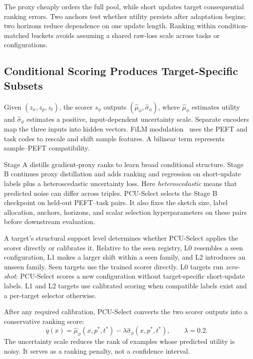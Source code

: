 The proxy cheaply orders the full pool, while short updates target consequential ranking errors. Two anchors test whether utility persists after adaptation begins; two horizons reduce dependence on one update length. Ranking within condition-matched buckets avoids assuming a shared raw-loss scale across tasks or configurations.

\subsection{Conditional Scoring Produces Target-Specific Subsets}

Given $(z_x,z_p,z_t)$, the scorer $s_{\phi}$ outputs $(\widehat{\mu}_{\phi},\widehat{\sigma}_{\phi})$, where $\widehat{\mu}_{\phi}$ estimates utility and $\widehat{\sigma}_{\phi}$ estimates a positive, input-dependent uncertainty scale. Separate encoders map the three inputs into hidden vectors. FiLM modulation~\cite{perez2018film} uses the PEFT and task codes to rescale and shift sample features. A bilinear term represents sample--PEFT compatibility.

Stage A distills gradient-proxy ranks to learn broad conditional structure. Stage B continues proxy distillation and adds ranking and regression on short-update labels plus a heteroscedastic uncertainty loss. Here \emph{heteroscedastic} means that predicted noise can differ across triples. PCU-Select selects the Stage B checkpoint on held-out PEFT--task pairs. It also fixes the sketch size, label allocation, anchors, horizons, and scalar selection hyperparameters on these pairs before downstream evaluation.

A target's structural support level determines whether PCU-Select applies the scorer directly or calibrates it. Relative to the seen registry, L0 resembles a seen configuration, L1 makes a larger shift within a seen family, and L2 introduces an unseen family. Seen targets use the trained scorer directly. L0 targets run \emph{zero-shot}: PCU-Select scores a new configuration without target-specific short-update labels. L1 and L2 targets use calibrated scoring when compatible labels exist and a per-target selector otherwise.

After any required calibration, PCU-Select converts the two scorer outputs into a conservative ranking score:
\begin{equation}
  q(x)=\widehat{\mu}_{\phi}(x,p^{*},t^{*})-\lambda\widehat{\sigma}_{\phi}(x,p^{*},t^{*}),\qquad \lambda=0.2.
  \label{eq:qscore}
\end{equation}
The uncertainty scale reduces the rank of examples whose predicted utility is noisy. It serves as a ranking penalty, not a confidence interval.

